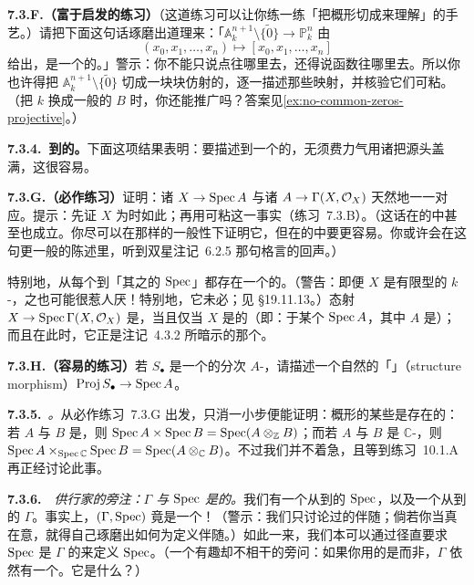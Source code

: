 \textbf{7.3.F.（富于启发的练习）}\quad （这道练习可以让你练一练「把概形切成\trAffine\trOpenSet{}来理解\trMorphism」的手艺。）请把下面这句话琢磨出道理来：「$\mathbb{A}^{n+1}_k\setminus\{\tilde{0}\}\to\mathbb{P}^n_k$ 由
\[
(x_0,x_1,\dots,x_n)\longmapsto[x_0,x_1,\dots,x_n]
\]
给出，是一个\trScheme{}的\trMorphism。」警示：你不能只说点往哪里去，还得说函数往哪里去。所以你也许得把 $\mathbb{A}^{n+1}_k\setminus\{\tilde{0}\}$ 切成一块块仿射的，逐一描述那些映射，并核验它们可粘。（把 $k$ 换成一般的\trRing{} $B$ 时，你还能推广吗？答案见\cref{ex:no-common-zeros-projective}。）

\textbf{7.3.4.\ 到\trAffineScheme{}的\trMorphism。}\quad 下面这项结果表明：要描述到一个\trAffineScheme{}的\trMorphism，无须费力气用诸\trAffine\trOpenSet{}把源头盖满，这很容易。

\textbf{7.3.G.（必作练习）}\quad 证明：诸\trMorphism{} $X\to\operatorname{Spec} A$ 与诸\trRingMorphism{} $A\to\Gamma(X,\mathcal{O}_X)$ 天然地一一对应。提示：先证 $X$ 为\trAffine{}时如此；再用\trMorphism{}可粘这一事实（练习~7.3.B）。（这话在\trLocallyRingedSpace{}的\trCategory{}中甚至也成立。你尽可以在那样的一般性下证明它，但在\trScheme{}的\trCategory{}中要更容易。你或许会在这句更一般的陈述里，听到双星注记~6.2.5 那句格言的回声。）

特别地，从每个\trScheme{}到「其\trGlobalSections{}之\trRing{}的 $\operatorname{Spec}$」都存在一个\trCanonical{}的\trMorphism。（警告：即便 $X$ 是有限型的 $k$-\trScheme，\trGlobalSections{}之\trRing{}也可能很惹人厌！特别地，它未必\trFinitelyGenerated；见 \S19.11.13。）\trCanonical{}态射 $X\to\operatorname{Spec}\Gamma(X,\mathcal{O}_X)$ 是\trIsomorphism，当且仅当 $X$ 是\trAffine{}的（即：\trIsomorphic{}于某个 $\operatorname{Spec} A$，其中 $A$ 是\trRing）；而且在此时，它正是注记~4.3.2 所暗示的那个\trIsomorphism。

\textbf{7.3.H.（容易的练习）}\quad 若 $S_\bullet$ 是一个\trFinitelyGenerated{}的分次 $A$-\trAlgebra，请描述一个自然的「\trStructureMorphism{}」（structure morphism）$\operatorname{Proj} S_\bullet\to\operatorname{Spec} A$。%

\textbf{7.3.5.}\ \emph{\trhRemark{}。}\quad 从必作练习~7.3.G 出发，只消一小步便能证明：概形的某些\trProduct{}是存在的：若 $A$ 与 $B$ 是\trRing，则 $\operatorname{Spec} A\times\operatorname{Spec} B=\operatorname{Spec}(A\otimes_{\mathbb{Z}}B)$；而若 $A$ 与 $B$ 是 $\mathbb{C}$-\trAlgebra，则 $\operatorname{Spec} A\times_{\operatorname{Spec}\mathbb{C}}\operatorname{Spec} B=\operatorname{Spec}(A\otimes_{\mathbb{C}}B)$。不过我们并不着急，且等到\mbox{练习~10.1.A}再正经讨论此事。

\textbf{7.3.6.}\ \extrahard\ \emph{供行家的旁注：$\Gamma$ 与 $\operatorname{Spec}$ 是\trAdjoint{}的。}\quad 我们有一个从\trRing{}到\trLocallyRingedSpace{}的\trContravariantFunctor{} $\operatorname{Spec}$，以及一个从\trLocallyRingedSpace{}到\trRing{}的\trContravariantFunctor{} $\Gamma$。事实上，$(\Gamma,\operatorname{Spec})$ 竟是一个\trAdjointPair！（警示：我们只讨论过\trCovariantFunctor{}的伴随；倘若你当真在意，就得自己琢磨出如何为\trContravariantFunctor{}定义伴随。）如此一来，我们本可以通过径直要求 $\operatorname{Spec}$ 是 $\Gamma$ 的\trRightAdjoint{}来定义 $\operatorname{Spec}$。（一个有趣却不相干的旁问：如果你用的是\trRingedSpace{}而非\trLocallyRingedSpace，$\Gamma$ 依然有一个\trRightAdjoint。它是什么？）

